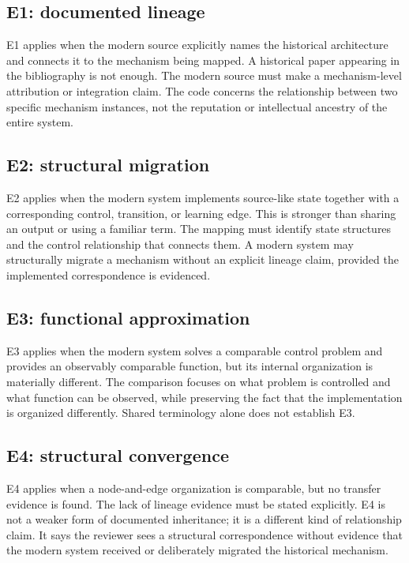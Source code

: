 \subsection{E1: documented lineage}

E1 applies when the modern source explicitly names the historical architecture and connects it to the mechanism being mapped. A historical paper appearing in the bibliography is not enough. The modern source must make a mechanism-level attribution or integration claim. The code concerns the relationship between two specific mechanism instances, not the reputation or intellectual ancestry of the entire system.

\subsection{E2: structural migration}

E2 applies when the modern system implements source-like state together with a corresponding control, transition, or learning edge. This is stronger than sharing an output or using a familiar term. The mapping must identify state structures and the control relationship that connects them. A modern system may structurally migrate a mechanism without an explicit lineage claim, provided the implemented correspondence is evidenced.

\subsection{E3: functional approximation}

E3 applies when the modern system solves a comparable control problem and provides an observably comparable function, but its internal organization is materially different. The comparison focuses on what problem is controlled and what function can be observed, while preserving the fact that the implementation is organized differently. Shared terminology alone does not establish E3.

\subsection{E4: structural convergence}

E4 applies when a node-and-edge organization is comparable, but no transfer evidence is found. The lack of lineage evidence must be stated explicitly. E4 is not a weaker form of documented inheritance; it is a different kind of relationship claim. It says the reviewer sees a structural correspondence without evidence that the modern system received or deliberately migrated the historical mechanism.


